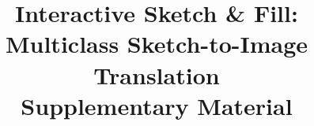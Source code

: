 \documentclass[10pt,twocolumn,letterpaper]{article}
\begin{document}
\title{Interactive Sketch \& Fill: Multiclass Sketch-to-Image Translation \\ Supplementary Material}

\end{document}
